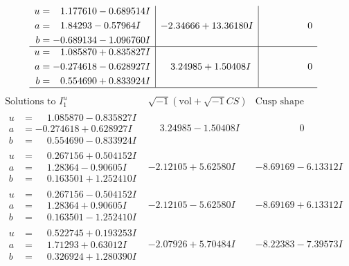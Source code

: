 \documentclass[1p]{elsarticle_modified}
\theoremstyle{definition}
\newcommand{\I}{\sqrt{-1}}
\begin{document}
$$\begin{array}{c|c|c}
\begin{aligned}
u &= \phantom{-}1.177610 - 0.689514 I \\
a &= \phantom{-}1.84293 - 0.57964 I \\
b &= -0.689134 - 1.096760 I\end{aligned}
 & -2.34666 + 13.36180 I & \phantom{-0.000000 } 0 \\ \hline\begin{aligned}
u &= \phantom{-}1.085870 + 0.835827 I \\
a &= -0.274618 - 0.628927 I \\
b &= \phantom{-}0.554690 + 0.833924 I\end{aligned}
 & \phantom{-}3.24985 + 1.50408 I & \phantom{-0.000000 } 0\\
 \hline 
 \end{array}$$\newpage$$\begin{array}{c|c|c}  
\text{Solutions to }I^u_{1}& \I (\text{vol} + \sqrt{-1}CS) & \text{Cusp shape}\\
 \hline 
\begin{aligned}
u &= \phantom{-}1.085870 - 0.835827 I \\
a &= -0.274618 + 0.628927 I \\
b &= \phantom{-}0.554690 - 0.833924 I\end{aligned}
 & \phantom{-}3.24985 - 1.50408 I & \phantom{-0.000000 } 0 \\ \hline\begin{aligned}
u &= \phantom{-}0.267156 + 0.504152 I \\
a &= \phantom{-}1.28364 - 0.90605 I \\
b &= \phantom{-}0.163501 + 1.252410 I\end{aligned}
 & -2.12105 + 5.62580 I & -8.69169 - 6.13312 I \\ \hline\begin{aligned}
u &= \phantom{-}0.267156 - 0.504152 I \\
a &= \phantom{-}1.28364 + 0.90605 I \\
b &= \phantom{-}0.163501 - 1.252410 I\end{aligned}
 & -2.12105 - 5.62580 I & -8.69169 + 6.13312 I \\ \hline\begin{aligned}
u &= \phantom{-}0.522745 + 0.193253 I \\
a &= \phantom{-}1.71293 + 0.63012 I \\
b &= \phantom{-}0.326924 + 1.280390 I\end{aligned}
 & -2.07926 + 5.70484 I & -8.22383 - 7.39573 I \\ \hline\begin{aligned}

\end{aligned}
\end{array}$$
\end{document}
